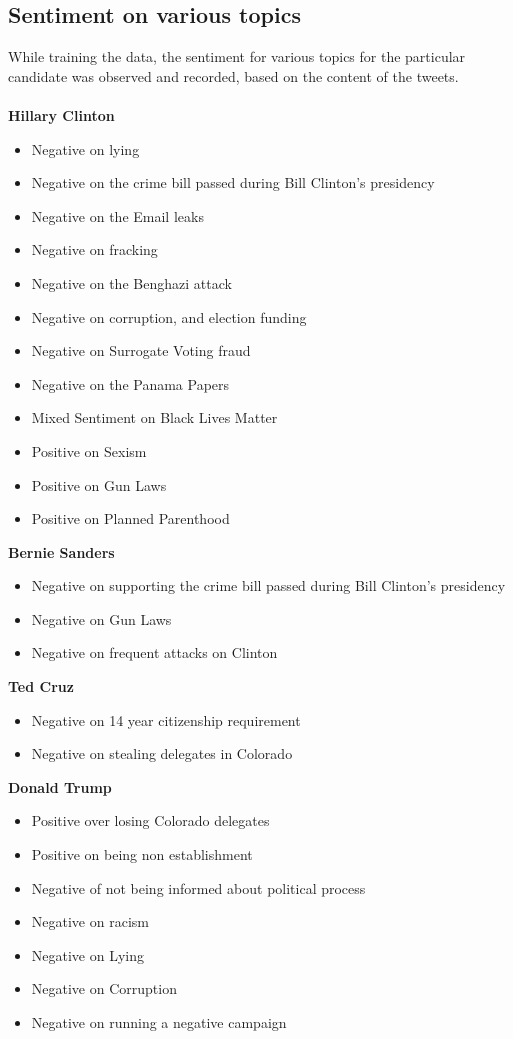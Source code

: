 \documentclass[twoside]{article}
\begin{document}
\begin{multicols}{2}
\subsection{Sentiment on various topics}
While training the data, the sentiment for various topics for the particular candidate was observed and recorded, based on the content of the tweets. \\ \\
\textbf{Hillary Clinton}
\begin{itemize}
\item Negative on lying
\item Negative on the crime bill passed during Bill Clinton's presidency
\item Negative on the Email leaks
\item Negative on fracking
\item Negative on the Benghazi attack
\item Negative on corruption, and election funding
\item Negative on Surrogate Voting fraud
\item Negative on the Panama Papers
\item Mixed Sentiment on Black Lives Matter
\item Positive on Sexism
\item Positive on Gun Laws
\item Positive on Planned Parenthood
\end{itemize}

\textbf{Bernie Sanders}
\begin{itemize}
\item Negative on supporting the crime bill passed during Bill Clinton's presidency
\item Negative on Gun Laws
\item Negative on frequent attacks on Clinton
\end{itemize}

\textbf{Ted Cruz}
\begin{itemize}
\item Negative on 14 year citizenship requirement
\item Negative on stealing delegates in Colorado
\end{itemize}

\textbf{Donald Trump}
\begin{itemize}
\item Positive over losing Colorado delegates
\item Positive on being non establishment
\item Negative of not being informed about political process
\item Negative on racism
\item Negative on Lying
\item Negative on Corruption
\item Negative on running a negative campaign
\end{itemize}



\end{multicols}
\end{document}
